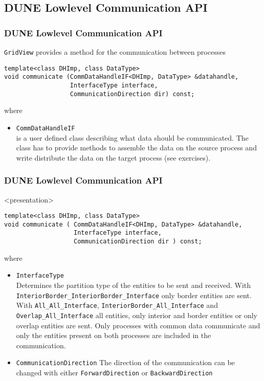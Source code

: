 \subsection{DUNE Lowlevel Communication API}
\begin{frame}[fragile]
  \frametitle<presentation>{DUNE Lowlevel Communication API}

  \texttt{GridView} provides a method for the communication between processes
    \begin{lstlisting}
template<class DHImp, class DataType>
void communicate (CommDataHandleIF<DHImp, DataType> &datahandle,
                  InterfaceType interface,
                  CommunicationDirection dir) const;
    \end{lstlisting}
where
    \begin{itemize}
    \item \lstinline!CommDataHandleIF!\\
      is a user defined class describing what data should be communicated. The class has to provide methods to assemble the data on the
      source process and write distribute the data on the target process (see exercises).
    \end{itemize}
\end{frame}


\begin{frame}[fragile]
  \frametitle<presentation>{DUNE Lowlevel Communication API}
  \begin{onlyenv}<presentation>
    \begin{lstlisting}
template<class DHImp, class DataType>
void communicate ( CommDataHandleIF<DHImp, DataType> &datahandle,
                   InterfaceType interface,
                   CommunicationDirection dir ) const;
    \end{lstlisting}
\lstset{basicstyle=\normalsize\ttfamily}
where
    \end{onlyenv}
    \begin{itemize}
    \item \lstinline!InterfaceType!\\
    Determines the partition type of the entities to be sent and received. With \lstinline!InteriorBorder_InteriorBorder_Interface! only
border entities are sent. With \lstinline!All_All_Interface!,
    \lstinline!InteriorBorder_All_Interface! and
    \lstinline!Overlap_All_Interface! all entities, only interior and border entities or only overlap entities are sent. Only processes with common
data communicate and only the entities present on both processes are included in the communication.
    \item \lstinline!CommunicationDirection!
      The direction of the communication can be changed with either \lstinline!ForwardDirection! or
      \lstinline!BackwardDirection!
    \end{itemize}
\end{frame}



